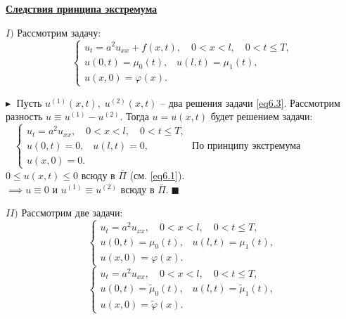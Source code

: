 \noindent\textbf{\underline{Следствия принципа экстремума}}

\noindent\textbf{$I)$} Рассмотрим задачу:
\begin{equation}\label{eq6.3}
    \begin{cases}
    u_t = a^2 u_{xx} + f(x, t),\quad 0<x<l, \quad 0<t \leq T, \\
    u(0, t) = \mu_0(t),\;\;\; u(l, t) = \mu_1(t),\\
    u(x, 0) = \varphi(x).
    \end{cases}
\end{equation}

$\blacktriangleright\;$ Пусть $u^{(1)}(x, t),\;u^{(2)}(x, t)$ -- два решения задачи \eqref{eq6.3}. Рассмотрим разность $u \equiv u^{(1)} - u^{(2)}$. Тогда $u = u(x, t)$ будет решением задачи:
$\;\;\;
    \begin{cases}
    u_t = a^2 u_{xx},\quad 0<x<l, \quad 0<t \leq T, \\
    u(0, t) = 0,\;\;\; u(l, t) = 0,\\
    u(x, 0) = 0.
    \end{cases} $\newline\noindent
По принципу экстремума $0 \leq u(x, t) \leq 0$ всюду в $\overline{\Pi}$ (см. \eqref{eq6.1}).\\ $\implies u \equiv 0$ и $u^{(1)} \equiv u^{(2)}$ всюду в $\overline{\Pi}$.$\;\blacksquare$ \newline\newline\noindent

\noindent\textbf{$II)$} Рассмотрим две задачи:
 \begin{equation}\label{eq6.4}
     \begin{cases}
    u_t = a^2 u_{xx},\quad 0<x<l, \quad 0<t \leq T, \\
    u(0, t) = \mu_0(t),\;\;\; u(l, t) = \mu_1(t),\\
    u(x, 0) = \varphi(x).
    \end{cases}
 \end{equation}
\begin{equation}\label{eq6.5}
    \begin{cases}
    u_t = a^2 u_{xx},\quad 0<x<l, \quad 0<t \leq T, \\
    u(0, t) = \widetilde{\mu}_0(t),\;\;\; u(l, t) = \widetilde{\mu}_1(t),\\
    u(x, 0) = \widetilde{\varphi}(x).
    \end{cases}
\end{equation}

